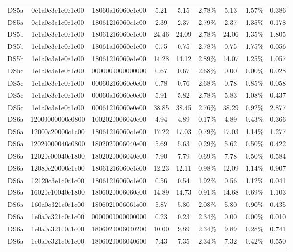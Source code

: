 \begin{tabular}{|c|c c|c|c c|c c|c|}
  DS5a & 0e1a0c3e1e0e1c00 & 18060a16060e1e00 & 5.21 & 5.15 & 2.78\% & 5.13 & 1.57\% & 0.386 \\
  DS5a & 0e1a0c3e1e0e1c00 & 18061216060e1e00 & 2.39 & 2.37 & 2.79\% & 2.37 & 1.35\% & 0.178 \\
  DS5b & 1e1a0c3e1e0c1c00 & 18061216060e1e00 & 24.46 & 24.09 & 2.78\% & 24.06 & 1.35\% & 1.805 \\
  DS5b & 1e1a0c3e1e0c1c00 & 18061a16060e1e00 & 0.75 & 0.75 & 2.78\% & 0.75 & 1.75\% & 0.056 \\
  DS5b & 1e1a0c3e1e0e1c00 & 18061216060e1e00 & 14.28 & 14.12 & 2.89\% & 14.07 & 1.25\% & 1.057 \\
  DS5c & 1e1a0c3e1e0c1c00 & 0000000000000000 & 0.67 & 0.67 & 2.68\% & 0.00 & 0.00\% & 0.028 \\
  DS5c & 1e1a0c3e1e0c1c00 & 00060216060e0e00 & 0.78 & 0.76 & 2.68\% & 0.78 & 0.85\% & 0.058 \\
  DS5c & 1e1a0c3e1e0c1c00 & 00060a16060e0e00 & 5.91 & 5.82 & 2.78\% & 5.83 & 1.08\% & 0.437 \\
  DS5c & 1e1a0c3e1e0c1c00 & 00061216060e0e00 & 38.85 & 38.45 & 2.76\% & 38.29 & 0.92\% & 2.877 \\
  DS6a & 12000000000c0800 & 1002020006040e00 & 4.94 & 4.89 & 0.17\% & 4.89 & 0.43\% & 0.366 \\
  DS6a & 12000c20000c1c00 & 18061216060c1e00 & 17.22 & 17.03 & 0.79\% & 17.03 & 1.14\% & 1.277 \\
  DS6a & 12020000040c0800 & 1802020006040e00 & 5.69 & 5.63 & 0.29\% & 5.62 & 0.50\% & 0.422 \\
  DS6a & 12020c00040c1800 & 1802020006040e00 & 7.90 & 7.79 & 0.69\% & 7.78 & 0.50\% & 0.584 \\
  DS6a & 12080c20000c1c00 & 18061216060c1e00 & 12.23 & 12.11 & 0.98\% & 12.09 & 1.14\% & 0.907 \\
  DS6a & 12120c3e1c0c1c00 & 18061216060c1e00 & 0.56 & 0.54 & 1.92\% & 0.56 & 1.12\% & 0.041 \\
  DS6a & 16020c10040c1800 & 1806020006060e00 & 14.89 & 14.73 & 0.91\% & 14.68 & 0.69\% & 1.103 \\
  DS6a & 160a0c321c0c1c00 & 1806021006061e00 & 5.87 & 5.80 & 2.08\% & 5.80 & 0.90\% & 0.435 \\
  DS6a & 1e0a0c321c0c1c00 & 0000000000000000 & 0.23 & 0.23 & 2.34\% & 0.00 & 0.00\% & 0.010 \\
  DS6a & 1e0a0c321c0c1c00 & 1806020006040200 & 10.00 & 9.89 & 2.34\% & 9.89 & 0.28\% & 0.741 \\
  DS6a & 1e0a0c321c0c1c00 & 1806020006040600 & 7.43 & 7.35 & 2.34\% & 7.32 & 0.42\% & 0.550 \\

\end{tabular}
